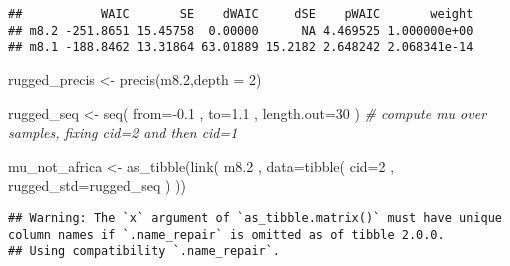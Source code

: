 \documentclass[
]{book}
\newenvironment{Shaded}{\begin{snugshade}}{\end{snugshade}}
\newcommand{\AttributeTok}[1]{\textcolor[rgb]{0.77,0.63,0.00}{#1}}
\newcommand{\CommentTok}[1]{\textcolor[rgb]{0.56,0.35,0.01}{\textit{#1}}}
\newcommand{\DecValTok}[1]{\textcolor[rgb]{0.00,0.00,0.81}{#1}}
\newcommand{\FloatTok}[1]{\textcolor[rgb]{0.00,0.00,0.81}{#1}}
\newcommand{\FunctionTok}[1]{\textcolor[rgb]{0.00,0.00,0.00}{#1}}
\newcommand{\NormalTok}[1]{#1}
\newcommand{\OtherTok}[1]{\textcolor[rgb]{0.56,0.35,0.01}{#1}}
\newcommand{\SpecialCharTok}[1]{\textcolor[rgb]{0.00,0.00,0.00}{#1}}
\begin{document}
\begin{verbatim}
##           WAIC       SE    dWAIC     dSE    pWAIC       weight
## m8.2 -251.8651 15.45758  0.00000      NA 4.469525 1.000000e+00
## m8.1 -188.8462 13.31864 63.01889 15.2182 2.648242 2.068341e-14
\end{verbatim}

\begin{Shaded}
\begin{Highlighting}[]
\NormalTok{rugged\_precis }\OtherTok{\textless{}{-}} \FunctionTok{precis}\NormalTok{(m8}\FloatTok{.2}\NormalTok{,}\AttributeTok{depth =} \DecValTok{2}\NormalTok{)}



\NormalTok{rugged\_seq }\OtherTok{\textless{}{-}} \FunctionTok{seq}\NormalTok{( }\AttributeTok{from=}\SpecialCharTok{{-}}\FloatTok{0.1}\NormalTok{ , }\AttributeTok{to=}\FloatTok{1.1}\NormalTok{ , }\AttributeTok{length.out=}\DecValTok{30}\NormalTok{ ) }\CommentTok{\# compute mu over samples, fixing cid=2 and then cid=1 }

\NormalTok{mu\_not\_africa }\OtherTok{\textless{}{-}} \FunctionTok{as\_tibble}\NormalTok{(}\FunctionTok{link}\NormalTok{( m8}\FloatTok{.2}\NormalTok{ ,}
\AttributeTok{data=}\FunctionTok{tibble}\NormalTok{( }\AttributeTok{cid=}\DecValTok{2}\NormalTok{ , }\AttributeTok{rugged\_std=}\NormalTok{rugged\_seq ) ))}
\end{Highlighting}
\end{Shaded}

\begin{verbatim}
## Warning: The `x` argument of `as_tibble.matrix()` must have unique column names if `.name_repair` is omitted as of tibble 2.0.0.
## Using compatibility `.name_repair`.
\end{verbatim}
\end{document}
